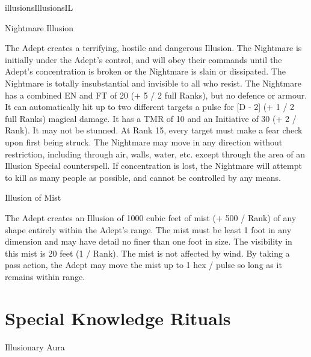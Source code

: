\begin{College}[1.5]{illusions}{Illusions}{IL}
\begin{spell}[S-14]{Nightmare Illusion}
\begin{effects}
The Adept creates a terrifying, hostile and dangerous Illusion.  The
Nightmare is initially under the Adept’s control, and will obey their
commands until the Adept’s concentration is broken or the Nightmare is
slain or dissipated.  The Nightmare is totally insubstantial and
invisible to all who resist.  The Nightmare has a combined EN and FT
of 20 (+ 5 / 2 full Ranks), but no defence or armour.  It can
automatically hit up to two different targets a pulse for [D - 2] (+ 1
/ 2 full Ranks) magical damage.  It has a TMR of 10 and an Initiative
of 30 (+ 2 / Rank).  It may not be stunned.  At Rank 15, every target
must make a fear check upon first being struck.  The Nightmare may
move in any direction without restriction, including through air,
walls, water, etc.  except through the area of an Illusion Special
counterspell.  If concentration is lost, the Nightmare will attempt to
kill as many people as possible, and cannot be controlled by any
means.
\end{effects}
\end{spell}

\begin{spell}[S-12]{Illusion of Mist}

\begin{effects}
The Adept creates an Illusion of 1000 cubic feet of mist (+ 500 /
Rank) of any shape entirely within the Adept’s range. The mist must be
least 1 foot in any dimension and may have detail no finer than one
foot in size. The visibility in this mist is 20 feet (1 / Rank). The
mist is not affected by wind.  By taking a pass action, the Adept may
move the mist up to 1 hex / pulse so long as it remains within range.
\end{effects}
\end{spell}


\section{Special Knowledge Rituals}

\begin{ritual}[R-1]{Illusionary Aura}


\end{ritual}
\end{College}
